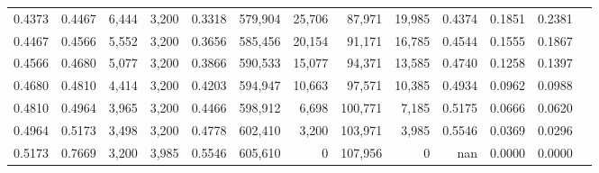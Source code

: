 \begin{tabular}{rrrrrrrrrrrrr}
0.4373 & 0.4467 &  6,444 & 3,200 &                                     0.3318 & 579,904 &  25,706 &  87,971 &  19,985 & 0.4374 & 0.1851 & 0.2381 \\
0.4467 & 0.4566 &  5,552 & 3,200 &                                     0.3656 & 585,456 &  20,154 &  91,171 &  16,785 & 0.4544 & 0.1555 & 0.1867 \\
0.4566 & 0.4680 &  5,077 & 3,200 &                                     0.3866 & 590,533 &  15,077 &  94,371 &  13,585 & 0.4740 & 0.1258 & 0.1397 \\
0.4680 & 0.4810 &  4,414 & 3,200 &                                     0.4203 & 594,947 &  10,663 &  97,571 &  10,385 & 0.4934 & 0.0962 & 0.0988 \\
0.4810 & 0.4964 &  3,965 & 3,200 &                                     0.4466 & 598,912 &   6,698 & 100,771 &   7,185 & 0.5175 & 0.0666 & 0.0620 \\
0.4964 & 0.5173 &  3,498 & 3,200 &                                     0.4778 & 602,410 &   3,200 & 103,971 &   3,985 & 0.5546 & 0.0369 & 0.0296 \\
0.5173 & 0.7669 &  3,200 & 3,985 &                                     0.5546 & 605,610 &       0 & 107,956 &       0 &    nan & 0.0000 & 0.0000 \\
\bottomrule
\end{tabular}
